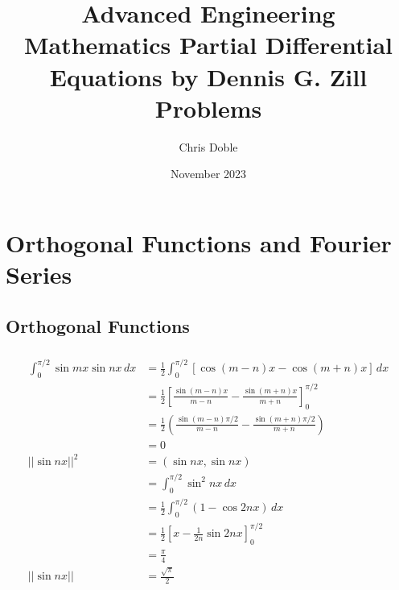 \documentclass{article}
\title{Advanced Engineering Mathematics Partial Differential Equations by Dennis G. Zill Problems}
\author{Chris Doble}
\date{November 2023}
\begin{document}
\maketitle

\tableofcontents

\setcounter{section}{11}
\section{Orthogonal Functions and Fourier Series}

\subsection{Orthogonal Functions}

\setcounter{subsubsection}{6}
\subsubsection{}

\begin{align*}
  \int_0^{\pi / 2} \sin m x \sin n x \,d x & = \frac{1}{2} \int_0^{\pi / 2} [\cos (m - n) x - \cos (m + n) x] \,d x                               \\
                                           & = \frac{1}{2} \left[ \frac{\sin (m - n) x}{m - n} - \frac{\sin (m + n) x}{m + n} \right]_0^{\pi / 2} \\
                                           & = \frac{1}{2} \left( \frac{\sin (m - n) \pi / 2}{m - n} - \frac{\sin (m + n) \pi / 2}{m + n} \right) \\
                                           & = 0                                                                                                  \\
  ||\sin n x||^2                           & = (\sin n x, \sin n x)                                                                               \\
                                           & = \int_0^{\pi / 2} \sin^2 n x \,d x                                                                  \\
                                           & = \frac{1}{2} \int_0^{\pi / 2} (1 - \cos 2 n x) \,d x                                                \\
                                           & = \frac{1}{2} \left[ x - \frac{1}{2 n} \sin 2 n x \right]_0^{\pi / 2}                                \\
                                           & = \frac{\pi}{4}                                                                                      \\
  ||\sin n x||                             & = \frac{\sqrt{\pi}}{2}
\end{align*}
\end{document}

